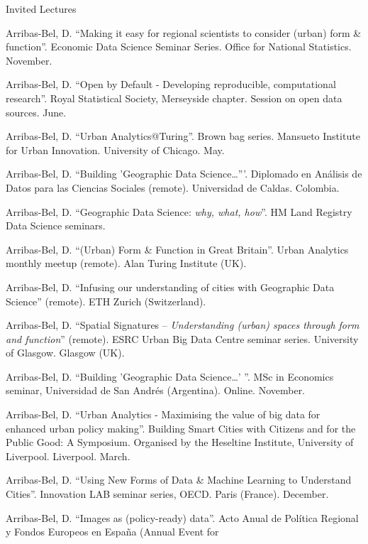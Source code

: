 \documentclass[12pt,2up]{article}
\begin{document}
\begin{cv}{}
\begin{cvlist}{Invited Lectures}
\item[2022] Arribas-Bel, D. ``Making it easy for regional scientists to
        consider (urban) form \& function''. Economic Data Science Seminar
        Series. Office for National Statistics. November.
\item[] Arribas-Bel, D. ``Open by Default - Developing reproducible,
        computational research''. Royal Statistical Society, Merseyside
        chapter. Session on open data sources. June.
\item[] Arribas-Bel, D. ``Urban Analytics@Turing''. Brown bag series. Mansueto
        Institute for Urban Innovation. University of Chicago. May.
\item[2021] Arribas-Bel, D. ``Building 'Geographic Data Science\ldots'''.
    Diplomado en An\'alisis de Datos para las Ciencias Sociales (remote). Universidad de
    Caldas. Colombia.
\item[] Arribas-Bel, D. ``Geographic Data Science: \textit{why, what,
    how}''. HM Land Registry Data Science seminars.
 \item[] Arribas-Bel, D. ``(Urban) Form \& Function in Great Britain''.
     Urban Analytics monthly meetup (remote). Alan Turing Institute (UK).
 \item[] Arribas-Bel, D. ``Infusing our understanding of cities with
     Geographic Data Science'' (remote). ETH Zurich (Switzerland).
 \item[    ] Arribas-Bel, D. ``Spatial Signatures -- \textit{Understanding
     (urban) spaces through form and function}'' (remote). ESRC Urban Big Data Centre
     seminar series. University of Glasgow. Glasgow (UK).
 \item[2020] Arribas-Bel, D. ``Building 'Geographic Data Science\ldots' ''. MSc
         in Economics seminar, Universidad de San Andr\'{e}s (Argentina).
         Online. November.
 \item[] Arribas-Bel, D. ``Urban Analytics - Maximising the value of big
     data for enhanced urban policy making''. Building Smart Cities with
     Citizens and for the Public Good: A Symposium. Organised by the Heseltine
     Institute, University of Liverpool. Liverpool. March.
 \item[2019] Arribas-Bel, D. ``Using New Forms of Data \& Machine Learning to 
     Understand Cities''. Innovation LAB seminar series, OECD. Paris (France).
     December.
 \item[] Arribas-Bel, D. ``Images as (policy-ready) data''. Acto Anual de
     Pol\'{i}tica Regional y Fondos Europeos en Espa\~{n}a (Annual Event for

\end{cvlist}
\end{cv}
\end{document}
